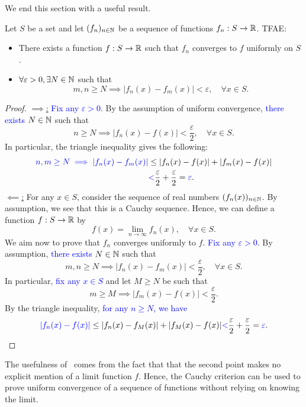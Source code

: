 We end this section with a useful result.
\begin{thm}
	\label{thm:unif_cauchy}
	Let $S$ be a set and let $(f_n)_{n\in\mathbb{N}}$ be a sequence of functions $f_n:S\to \mathbb{R}$. TFAE:
	\begin{itemize}
		\item There exists a function $f:S\to \mathbb{R}$ such that $f_n$ converges to $f$ uniformly on $S$.
		\item $\forall \varepsilon>0, \exists N\in\mathbb{N}$ such that
		\[
		m,n\ge N\implies |f_n(x) - f_m(x)|<\varepsilon,\quad \forall x\in S.
		\]
	\end{itemize}
\end{thm}
\begin{proof}
	\ul{$\implies$:} \textcolor{blue}{Fix any $\varepsilon>0$.} By the assumption of uniform convergence, \textcolor{blue}{there exists $N\in \mathbb{N}$} such that
	\[
	n\ge N \implies |f_n(x) - f(x)|<\frac{\varepsilon}{2},\quad \forall x \in S.
	\]
	In particular, the triangle inequality gives the following:
	\begin{align*}
		\textcolor{blue}{n,m\ge N\implies|f_n(x) - f_m(x)|} &\le |f_n(x) - f(x)| + |f_m(x) - f(x)| \\
		&\textcolor{blue}{<}\frac{\varepsilon}{2} + \frac{\varepsilon}{2} = \textcolor{blue}{\varepsilon}.
	\end{align*}
	\ul{$\impliedby$:} For any $x\in S$, consider the sequence of real numbers $(f_n(x))_{n\in\mathbb{N}}$. By assumption, we see that this is a Cauchy sequence. Hence, we can define a function $f:S\to \mathbb{R}$ by
	\[
	f(x) = \lim_{n\to \infty}f_n(x),\quad \forall x\in S.
	\]
	We aim now to prove that $f_n$ converges uniformly to $f$. \textcolor{blue}{Fix any $\varepsilon>0$.} By assumption, \textcolor{blue}{there exists $N\in \mathbb{N}$} such that
	\[
	m,n\ge N\implies |f_n(x) - f_m(x)|< \frac{\varepsilon}{2},\quad \forall x \in S.
	\]
	In particular, \textcolor{blue}{fix any $x\in S$} and let $M\ge N$ be such that
	\[
	m \ge M \implies |f_m(x) - f(x)| < \frac{\varepsilon}{2}.
	\]
	By the triangle inequality, \textcolor{blue}{for any $n\ge N$, we have}
	\[
	\textcolor{blue}{|f_n(x) - f(x)|} \le |f_n(x) - f_M(x)| + |f_M(x) - f(x)| \textcolor{blue}{<}\frac{\varepsilon}{2} + \frac{\varepsilon}{2} = \textcolor{blue}{\varepsilon}.
	\]
\end{proof}
The usefulness of~ comes from the fact that that the second point makes no explicit mention of a limit function $f$. Hence, the Cauchy criterion can be used to prove uniform convergence of a sequence of functions without relying on knowing the limit.